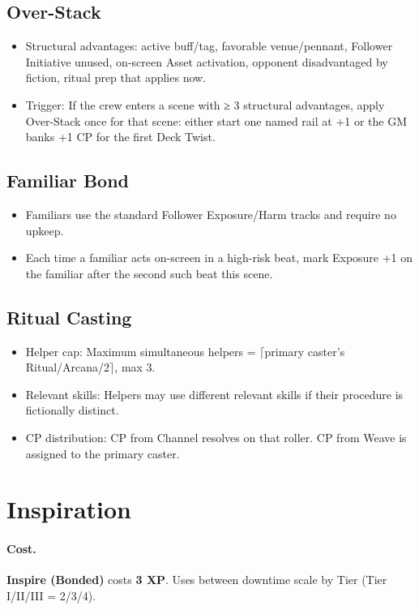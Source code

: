 \documentclass[11pt]{article}
\begin{document}
\subsection{Over-Stack}
\begin{itemize}
    \item Structural advantages: active buff/tag, favorable venue/pennant, Follower Initiative unused, on-screen Asset activation, opponent disadvantaged by fiction, ritual prep that applies now.
    \item Trigger: If the crew enters a scene with ≥ 3 structural advantages, apply Over-Stack once for that scene: either start one named rail at +1 or the GM banks +1 CP for the first Deck Twist.
\end{itemize}

\subsection{Familiar Bond}
\begin{itemize}
    \item Familiars use the standard Follower Exposure/Harm tracks and require no upkeep.
    \item Each time a familiar acts on-screen in a high-risk beat, mark Exposure +1 on the familiar after the second such beat this scene.
\end{itemize}

\subsection{Ritual Casting}
\begin{itemize}
    \item Helper cap: Maximum simultaneous helpers = $\lceil$primary caster's Ritual/Arcana/2$\rceil$, max 3.
    \item Relevant skills: Helpers may use different relevant skills if their procedure is fictionally distinct.
    \item CP distribution: CP from Channel resolves on that roller. CP from Weave is assigned to the primary caster.
\end{itemize}

\section{Inspiration}

\paragraph{Cost.}
\textbf{Inspire (Bonded)} costs \textbf{3 XP}. Uses between downtime scale by Tier (Tier I/II/III = 2/3/4).
\end{document}
